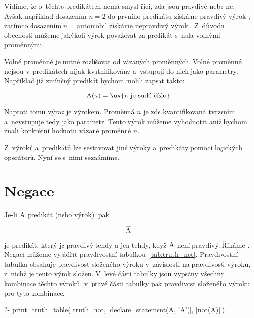 Vidíme, že o~těchto predikátech nemá smysl řící, zda jsou pravdivé nebo ne. Avšak například dosazením \(n = 2\) do prvního predikátu získáme pravdivý výrok , zatímco dosazením \(n = \mathrm{automobil}\) získáme nepravdivý výrok . Z~důvodu obecnosti můžeme jakýkoli výrok považovat za predikát s~nula volnými proměnnými.

Volné proměnné je nutné rozlišovat od vázaných proměnných. Volné proměnné nejsou v~predikátech nijak kvatnifikovány a~vstupují do nich  jako parametry. Například již zmíněný predikát bychom mohli zapsat takto:

\begin{equation}
\predicate{A}(n) = \text{\uv{\(n\) je sudé číslo}}
\end{equation}

Naproti tomu výraz  je výrokem. Proměnná \(n\) je zde kvantifikovaná tvrzením  a~nevstupuje tedy jako parametr. Tento výrok můžeme vyhodnotit aniž bychom znali konkrétní hodnotu vázané proměnné \(n\).

Z~výroků a~predikátů lze sestavovat jiné výroky a~predikáty pomocí logických operátorů. Nyní se s~nimi seznámíme.

\section{Negace}

Je-li \(\mathrm{A}\) predikát (nebo výrok), pak

\begin{equation}
\overline{\mathrm{A}} 
\end{equation}

je predikát, který je pravdivý tehdy a jen tehdy, když \(\mathrm{A}\) není pravdivý. Říkáme . Negaci můžeme vyjádřit pravdivostní tabulkou~\ref{tab:truth_not}. Pravdivostní tabulka obsahuje pravdivost složeného výroku v~závislosti na pravdivosti výroků, z~nichž je tento výrok složen. V~levé části tabulky jsou vypsány všechny kombinace těchto výroků, v~pravé části tabulky pak pravdivost složeného výroku pro tyto kombinace.  

\begin{prolog}
?- print_truth_table(
	truth_not,
	[declare_statement(A, 'A')],
	[not(A)]
).
\end{prolog}

